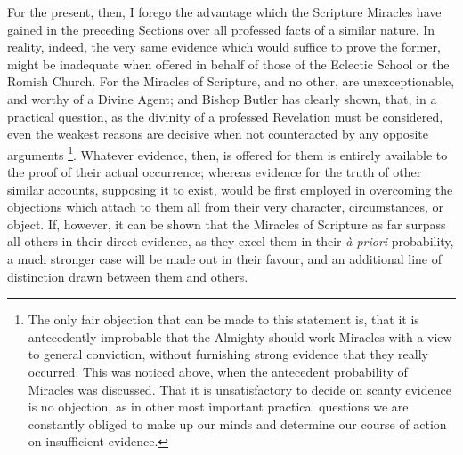For the present, then, I forego the advantage
which the Scripture Miracles have gained in the preceding Sections
over all professed facts of a similar nature. In reality, indeed, the
very same evidence which would suffice to prove the former, might be
inadequate when offered in behalf of those of the Eclectic School or
the Romish Church. For the Miracles of Scripture, and no other, are
unexceptionable, and worthy of a Divine Agent; and Bishop Butler has
clearly shown, that, in a practical question, as the divinity of a
professed Revelation must be considered, even the weakest reasons are
decisive when not counteracted by any opposite arguments \footnote{The only fair objection that can be made to this statement is, that it
is antecedently improbable that the Almighty should work Miracles with
a view to general conviction, without furnishing strong evidence that
they really occurred. This was noticed above, when the antecedent
probability of Miracles was discussed. That it is unsatisfactory to
decide on scanty evidence is no objection, as in other most important
practical questions we are constantly obliged to make up our minds and
determine our course of action on insufficient evidence.}. Whatever evidence, then, is offered for them is entirely
available to the proof of their actual occurrence; whereas evidence
for the truth of other similar accounts, supposing it to exist, would
be first employed in overcoming the objections which attach to them
all from their very character, circumstances, or object. If, however,
it can be shown that the Miracles of Scripture as far surpass all
others in their direct evidence, as they excel them in their \emph{à
priori} probability, a much stronger case will be made out in their
favour, and an additional line of distinction drawn between them and
others.

